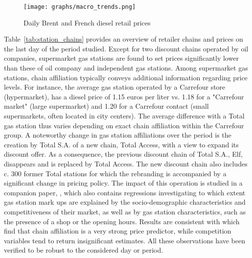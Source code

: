 \documentclass[english]{article}
\begin{document}
\begin{figure}[H]
    \caption{Daily Brent and French diesel retail prices}
	\centering
		\texttt{[image: graphs/macro\_trends.png]}
\label{fig:brent_and_diesel}
\end{figure}

Table~\ref{tab:station_chains} provides an overview of retailer chains and prices on the last day of the period studied. Except for two discount chains operated by oil companies, supermarket gas stations are found to set prices significantly lower than these of oil company and independent gas stations. Among supermarket gas stations, chain affiliation typically conveys additional information regarding price levels. For instance, the average gas station operated by a Carrefour store (hypermarket), has a diesel price of 1.15 euros per liter vs. 1.18 for a "Carrefour market" (large supermarket) and 1.20 for a Carrefour contact (small supermarkets, often located in city centers). The average difference with a Total gas station thus varies depending on exact chain affiliation within the Carrefour group. A noteworthy change in gas station affiliations over the period is the creation by Total S.A. of a new chain, Total Access, with a view to expand its discount offer. As a consequence, the previous discount chain of Total S.A., Elf, disappears and is replaced by Total Access. The new discount chain also includes c. 300 former Total stations for which the rebranding is accompanied by a significant change in pricing policy. The impact of this operation is studied in a companion paper, \cite{CHA16}, which also contains regressions investigating to which extent gas station mark ups are explained by the socio-demographic characteristics and competitiveness of their market, as well as by gas station characteristics, such as the presence of a shop or the opening hours. Results are consistent with \cite{HOS08} which find that chain affiliation is a very strong price predictor, while competition variables tend to return insignificant estimates. All these observations have been verified to be robust to the considered day or period.
\end{document}
